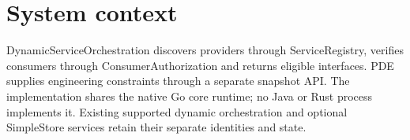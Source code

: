 \documentclass[a4paper]{arrowhead}
\begin{document}
\ArrowheadSetup
\section{System context}
DynamicServiceOrchestration discovers providers through ServiceRegistry, verifies consumers through ConsumerAuthorization and returns eligible interfaces. PDE supplies engineering constraints through a separate snapshot API. The implementation shares the native Go core runtime; no Java or Rust process implements it. Existing supported dynamic orchestration and optional SimpleStore services retain their separate identities and state.
\end{document}

